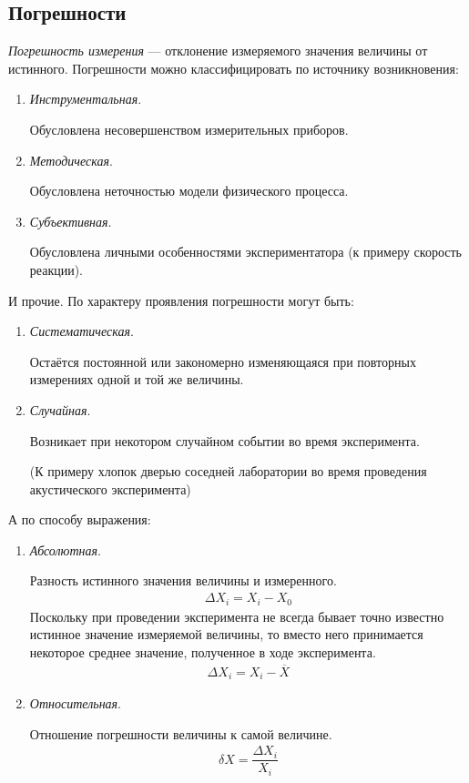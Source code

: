 \documentclass[a4paper, usenames, dvipsnames]{article}
\begin{document}
\subsection*{Погрешности}

{\it Погрешность измерения} --- отклонение измеряемого значения величины от истинного.
Погрешности можно классифицировать по источнику возникновения:
\begin{enumerate}
    \item {\it Инструментальная}.
    
    Обусловлена несовершенством измерительных приборов.
    \item {\it Методическая}.
    
    Обусловлена неточностью модели физического процесса.
    \item {\it Субъективная}.
    
    Обусловлена личными особенностями экспериментатора (к примеру скорость реакции).
\end{enumerate}
И прочие. По характеру проявления погрешности могут быть:
\begin{enumerate}
    \item {\it Систематическая}.
    
    Остаётся постоянной или закономерно изменяющаяся при
    повторных измерениях одной и той же величины.
    \item {\it Случайная}.
    
    Возникает при некотором случайном событии во время эксперимента.

    (К примеру хлопок дверью соседней лаборатории во время проведения акустического эксперимента)
\end{enumerate}
А по способу выражения:
\begin{enumerate}
    \item {\it Абсолютная}.
    
    Разность истинного значения величины и измеренного.
    \begin{gather*}
        \Delta X_i = X_i - X_0
    \end{gather*}
    Поскольку при проведении эксперимента не всегда бывает
    точно известно истинное значение измеряемой величины,
    то вместо него принимается некоторое среднее значение,
    полученное в ходе эксперимента.
    \begin{gather*}
        \Delta X_i = X_i - \overline{X}
    \end{gather*}
    
    \item {\it Относительная}.
    
    Отношение погрешности величины к самой величине.
    \begin{gather*}
        \delta X = \dfrac{\Delta X_i}{X_i}
    \end{gather*}
\end{enumerate}
\end{document}
